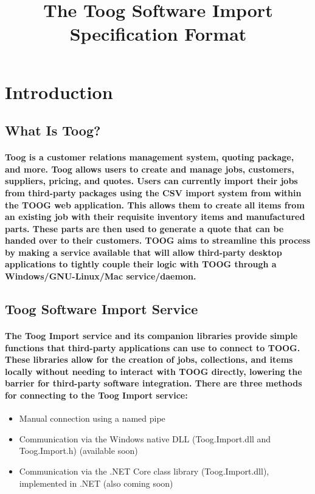 \documentclass{memoir}
\begin{document}
	
	\title{The Toog Software Import Specification Format}
	\maketitle
	\pagebreak
	\tableofcontents
	\pagebreak
	
	\section{Introduction}
	
	\subsection{What Is Toog?}
	\paragraph{
		Toog is a customer relations management system, quoting package, and more. Toog allows users to create and manage jobs, customers, suppliers, pricing, and quotes. Users can currently import their jobs from third-party packages using the CSV import system from within the TOOG web application. This allows them to create all items from an existing job with their requisite inventory items and manufactured parts. These parts are then used to generate a quote that can be handed over to their customers. TOOG aims to streamline this process by making a service available that will allow third-party desktop applications to tightly couple their logic with TOOG through a Windows/GNU-Linux/Mac service/daemon.}
	
	\subsection{Toog Software Import Service}
	
	\paragraph{
		The Toog Import service and its companion libraries provide simple functions that third-party applications can use to connect to TOOG. These libraries allow for the creation of jobs, collections, and items locally without needing to interact with TOOG directly, lowering the barrier for third-party software integration. There are three methods for connecting to the Toog Import service:
	}
	
	\begin{itemize}
		\item Manual connection using a named pipe
		\item Communication via the Windows native DLL (Toog.Import.dll and Toog.Import.h) (available soon)
		\item Communication via the .NET Core class library (Toog.Import.dll), implemented in .NET (also coming soon)
	\end{itemize}
	
\end{document}
